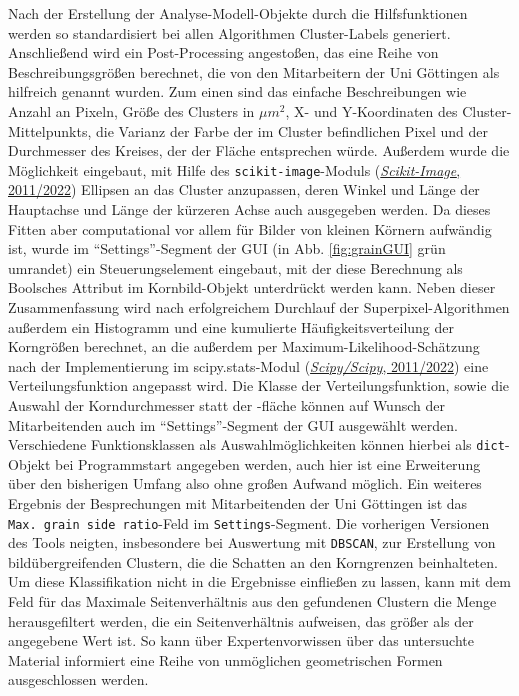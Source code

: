 \documentclass[
  12pt,
  openany]{book}
\begin{document}
Nach der Erstellung der Analyse-Modell-Objekte durch die Hilfsfunktionen werden so standardisiert bei allen Algorithmen Cluster-Labels generiert. Anschließend wird ein Post-Processing angestoßen, das eine Reihe von Beschreibungsgrößen berechnet, die von den Mitarbeitern der Uni Göttingen als hilfreich genannt wurden. Zum einen sind das einfache Beschreibungen wie Anzahl an Pixeln, Größe des Clusters in \(\mu m^2\), X- und Y-Koordinaten des Cluster-Mittelpunkts, die Varianz der Farbe der im Cluster befindlichen Pixel und der Durchmesser des Kreises, der der Fläche entsprechen würde. Außerdem wurde die Möglichkeit eingebaut, mit Hilfe des \texttt{scikit-image}-Moduls (\protect\hyperlink{ref-ScikitimageImageProcessing2022}{\emph{Scikit-Image}, 2011/2022}) Ellipsen an das Cluster anzupassen, deren Winkel und Länge der Hauptachse und Länge der kürzeren Achse auch ausgegeben werden. Da dieses Fitten aber computational vor allem für Bilder von kleinen Körnern aufwändig ist, wurde im ``Settings''-Segment der GUI (in Abb. \ref{fig:grainGUI} grün umrandet) ein Steuerungselement eingebaut, mit der diese Berechnung als Boolsches Attribut im Kornbild-Objekt unterdrückt werden kann.
Neben dieser Zusammenfassung wird nach erfolgreichem Durchlauf der Superpixel-Algorithmen außerdem ein Histogramm und eine kumulierte Häufigkeitsverteilung der Korngrößen berechnet, an die außerdem per Maximum-Likelihood-Schätzung nach der Implementierung im scipy.stats-Modul (\protect\hyperlink{ref-ScipyScipy2022}{\emph{Scipy/Scipy}, 2011/2022}) eine Verteilungsfunktion angepasst wird. Die Klasse der Verteilungsfunktion, sowie die Auswahl der Korndurchmesser statt der -fläche können auf Wunsch der Mitarbeitenden auch im ``Settings''-Segment der GUI ausgewählt werden. Verschiedene Funktionsklassen als Auswahlmöglichkeiten können hierbei als \texttt{dict}-Objekt bei Programmstart angegeben werden, auch hier ist eine Erweiterung über den bisherigen Umfang also ohne großen Aufwand möglich.
Ein weiteres Ergebnis der Besprechungen mit Mitarbeitenden der Uni Göttingen ist das \texttt{Max.\ grain\ side\ ratio}-Feld im \texttt{Settings}-Segment. Die vorherigen Versionen des Tools neigten, insbesondere bei Auswertung mit \texttt{DBSCAN}, zur Erstellung von bildübergreifenden Clustern, die die Schatten an den Korngrenzen beinhalteten. Um diese Klassifikation nicht in die Ergebnisse einfließen zu lassen, kann mit dem Feld für das Maximale Seitenverhältnis aus den gefundenen Clustern die Menge herausgefiltert werden, die ein Seitenverhältnis aufweisen, das größer als der angegebene Wert ist. So kann über Expertenvorwissen über das untersuchte Material informiert eine Reihe von unmöglichen geometrischen Formen ausgeschlossen werden.
\end{document}
